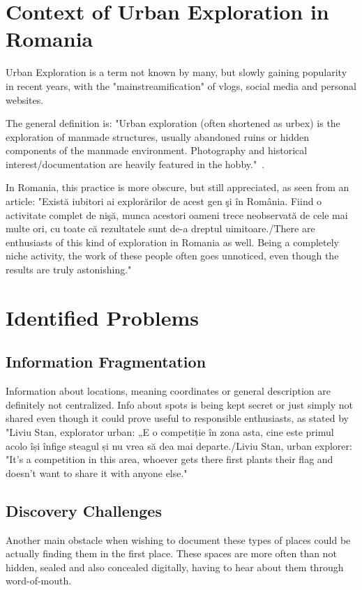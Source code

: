 \documentclass[12pt,a4paper]{report}
\begin{document}
\section{Context of Urban Exploration in Romania}
Urban Exploration is a term not known by many, but slowly gaining popularity in recent years, with the "mainstreamification" of vlogs, social media and personal websites.

The general definition is: "Urban exploration (often shortened as urbex) is the exploration of manmade structures, usually abandoned ruins or hidden components of the manmade environment. Photography and historical interest/documentation are heavily featured in the hobby."~\cite{wikipediaUrbexDefinition}.

In Romania, this practice is more obscure, but still appreciated, as seen from an article: "Există iubitori ai explorărilor de acest gen şi în România. Fiind o activitate complet de nişă, munca acestori oameni trece neobservată de cele mai multe ori, cu toate că rezultatele sunt de-a dreptul uimitoare./There are enthusiasts of this kind of exploration in Romania as well. Being a completely niche activity, the work of these people often goes unnoticed, even though the results are truly astonishing."~\cite{articleUrbexRomania}

\section{Identified Problems}
\subsection{Information Fragmentation}
Information about locations, meaning coordinates or general description are definitely not centralized. Info about spots is being kept secret or just simply not shared even though it could prove useful to responsible enthusiasts, as stated by "Liviu Stan, explorator urban: „E o competiție în zona asta, cine este primul acolo își înfige steagul și nu vrea să dea mai departe./Liviu Stan, urban explorer: "It's a competition in this area, whoever gets there first plants their flag and doesn't want to share it with anyone else."~\cite{articleUrbexInformation}

\subsection{Discovery Challenges}
Another main obstacle when wishing to document these types of places could be actually finding them in the first place. These spaces are more often than not hidden, sealed and also concealed digitally, having to hear about them through word-of-mouth.
\end{document}
